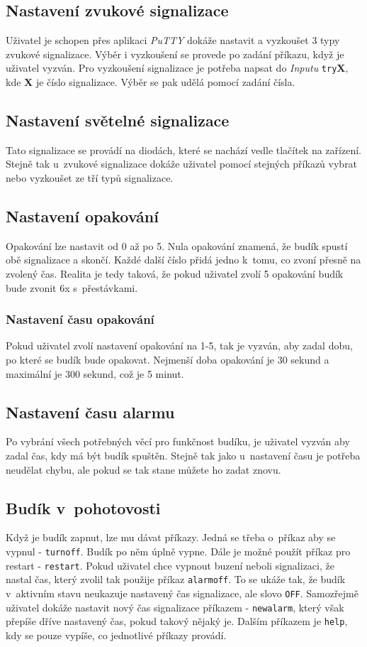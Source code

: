 \documentclass[11pt,a4paper]{article}
\begin{document}
\subsection{Nastavení zvukové signalizace}
Uživatel je schopen přes aplikaci \emph{PuTTY} dokáže nastavit a vyzkoušet 3 typy zvukové signalizace. Výběr i vyzkoušení se provede po zadání příkazu, když je uživatel vyzván. Pro vyzkoušení signalizace je potřeba napsat do \emph{Inputu} \verb|try|\textbf{X}, kde \textbf{X} je číslo signalizace. Výběr se pak udělá pomocí zadání čísla.

\subsection{Nastavení světelné signalizace}
Tato signalizace se provádí na diodách, které se nachází vedle tlačítek na zařízení. Stejně tak u~zvukové signalizace dokáže uživatel pomocí stejných příkazů vybrat nebo vyzkoušet ze tří typů signalizace.

\subsection{Nastavení opakování}
Opakování lze nastavit od 0 až po 5. Nula opakování znamená, že budík spustí obě signalizace a skončí. Každé další číslo přidá jedno k~tomu, co zvoní přesně na zvolený čas. Realita je tedy taková, že pokud uživatel zvolí 5 opakování budík bude zvonit 6x s~přestávkami.

\subsubsection{Nastavení času opakování}
Pokud uživatel zvolí nastavení opakování na 1-5, tak je vyzván, aby zadal dobu, po které se budík bude opakovat. Nejmenší doba opakování je 30 sekund a maximální je 300 sekund, což je 5 minut.

\subsection{Nastavení času alarmu}
Po vybrání všech potřebných věcí pro funkčnost budíku, je uživatel vyzván aby zadal čas, kdy má být budík spuštěn. Stejně tak jako u~nastavení času je potřeba neudělat chybu, ale pokud se tak stane můžete ho zadat znovu.

\subsection{Budík v~pohotovosti}
Když je budík zapnut, lze mu dávat příkazy. Jedná se třeba o~příkaz aby se vypnul - \verb|turnoff|. Budík po něm úplně vypne. Dále je možné použít příkaz pro restart - \verb|restart|. Pokud uživatel chce vypnout buzení neboli signalizaci, že nastal čas, který zvolil tak použije příkaz \verb|alarmoff|. To se ukáže tak, že budík v~aktivním stavu neukazuje nastavený čas signalizace, ale slovo \verb|OFF|. Samozřejmě uživatel dokáže nastavit nový čas signalizace příkazem - \verb|newalarm|, který však přepíše dříve nastavený čas, pokud takový nějaký je. Dalším příkazem je \verb|help|, kdy se pouze vypíše, co jednotlivé příkazy provádí.
\end{document}
